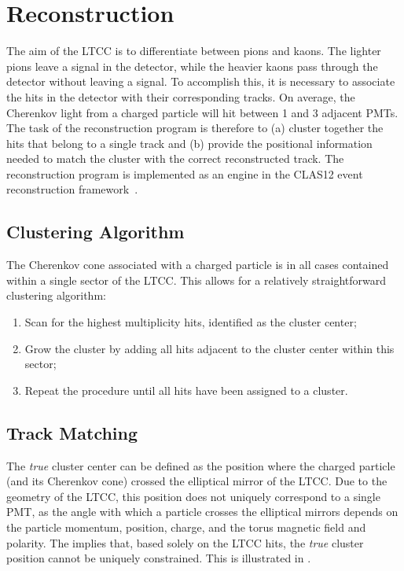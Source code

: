 \section{Reconstruction}

The aim of the LTCC is to differentiate between pions and kaons. The lighter pions leave a signal in the detector,
while the heavier kaons pass through the detector without leaving a signal. To accomplish this, it is necessary to
associate the hits in the detector with their corresponding tracks. On average, the Cherenkov light from a charged
particle will hit between 1 and 3 adjacent PMTs. The task of the reconstruction program is therefore to (a) cluster
together the hits that belong to a single track and (b) provide the positional information needed to match the cluster
with the correct reconstructed track. The reconstruction program is implemented as an engine in the CLAS12 event
reconstruction framework~\cite{recon-nim}.

\subsection{Clustering Algorithm}

The Cherenkov cone associated with a charged particle is in all cases contained within a single sector of the LTCC.
This allows for a relatively straightforward clustering algorithm:

\begin{enumerate}
    \item Scan for the highest multiplicity hits, identified as the cluster center;
    \item Grow the cluster by adding all hits adjacent to the cluster center within this sector;
    \item Repeat the procedure until all hits have been assigned to a cluster.
\end{enumerate}

\subsection{Track Matching}

The \textit{true} cluster center can be defined as the position where the charged particle (and its Cherenkov cone)
crossed the elliptical mirror of the LTCC. Due to the geometry of the LTCC, this position does not uniquely correspond
to a single PMT, as the angle with which a particle crosses the elliptical mirrors depends on the particle momentum,
position, charge, and the torus magnetic field and polarity. The implies that, based solely on the LTCC hits, the
\textit{true} cluster position cannot be uniquely constrained. This is illustrated in .

